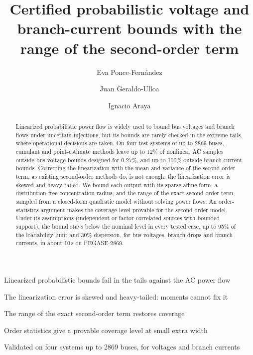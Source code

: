 \documentclass[preprint,12pt]{elsarticle}
\newcommand{\nota}[1]{\textcolor{red}{[NOTA: #1]}}
\begin{document}
\begin{frontmatter}

\title{Certified probabilistic voltage and branch-current bounds with the range of the second-order term}

\author[pucv]{Eva Ponce-Fernández}
\author[pucv]{Juan Geraldo-Ulloa}
\author[pucv]{Ignacio Araya}

\begin{abstract}
Linearized probabilistic power flow is widely used to bound bus voltages and branch flows under uncertain
injections, but its bounds are rarely checked in the extreme tails, where operational decisions are taken. On four
test systems of up to 2869 buses, cumulant and point-estimate methods leave up to 12\% of nonlinear AC samples outside
bus-voltage bounds designed for 0.27\%, and up to 100\% outside branch-current bounds. Correcting the linearization
with the mean and variance of the second-order term, as existing second-order methods do, is not enough: the
linearization error is skewed and heavy-tailed. We bound each output with its sparse affine form, a
distribution-free concentration radius, and the range of the exact second-order term, sampled from a closed-form
quadratic model without solving power flows. An order-statistics argument makes the coverage level provable for the
second-order model. Under its assumptions (independent or factor-correlated sources with bounded support), the bound
stays below the nominal level in every tested case, up to 95\% of the loadability limit and 30\% dispersion, for bus
voltages, branch drops and branch currents, in about 10\,s on PEGASE-2869.
\end{abstract}

\begin{highlights}
\item Linearized probabilistic bounds fail in the tails against the AC power flow
\item The linearization error is skewed and heavy-tailed: moments cannot fix it
\item The range of the exact second-order term restores coverage
\item Order statistics give a provable coverage level at small extra width
\item Validated on four systems up to 2869 buses, for voltages and branch currents
\end{highlights}


\end{frontmatter}
\end{document}
